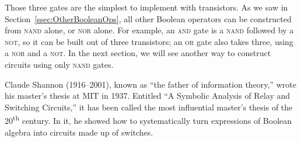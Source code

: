 Those three gates are the simplest to implement with transistors. As we saw in Section~\ref{ssec:OtherBooleanOps}, all other Boolean operators can be constructed from \textsc{nand} alone, or \textsc{nor} alone. For example, an \textsc{and} gate is a \textsc{nand} followed by a \textsc{not}, so it can be built out of three transistors; an \textsc{or} gate also takes three, using a \textsc{nor} and a \textsc{not}. In the next section, we will see another way to construct circuits using only \textsc{nand} gates.

\begin{tailquote}
Claude Shannon (1916--2001), known as ``the father of information theory,'' wrote his master's thesis at MIT in 1937. Entitled ``A Symbolic Analysis of Relay and Switching Circuits,'' it has been called the most influential master's thesis of the 20\textsuperscript{th} century. In it, he showed how to systematically turn expressions of Boolean algebra into circuits made up of switches.
\end{tailquote}
